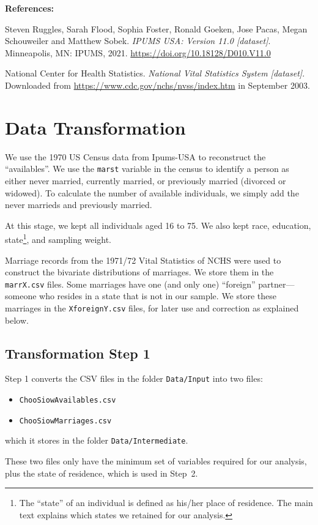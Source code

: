\documentclass[11pt]{article}
\theoremstyle{plain}
\theoremstyle{definition}
\begin{document}
\bigskip

{\bf References:}

Steven Ruggles, Sarah Flood, Sophia Foster, Ronald Goeken, Jose Pacas,
Megan Schouweiler and Matthew Sobek. {\em IPUMS USA: Version 11.0
  [dataset]}. Minneapolis, MN: IPUMS,
2021. \url{https://doi.org/10.18128/D010.V11.0}

National Center for Health Statistics. {\em National Vital Statistics
  System [dataset]}.  Downloaded from
\url{https://www.cdc.gov/nchs/nvss/index.htm} in September 2003.



\section{Data Transformation}
We use the 1970 US Census data from Ipums-USA to reconstruct the ``availables''. 
We use the \verb|marst| variable in the census to identify a person as either never married, currently married, or previously married (divorced or widowed). To calculate the number of available individuals, we simply add the never marrieds and previously married. 

At this stage, we  
kept all individuals aged 16 to 75. We also kept race, education, state\footnote{The ``state'' of an individual is defined as his/her place of residence. The main text explains which states we retained for our analysis.}, and sampling weight.

 
Marriage records from the 1971/72  Vital Statistics of NCHS were used to construct the bivariate distributions of marriages. We store them in the \verb|marrX.csv| files. Some marriages  have one (and only one) ``foreign'' partner---someone who resides in a state that is not in our sample. We store these marriages in the \verb|XforeignY.csv| files, for later use and correction as explained below.


\subsection{Transformation Step 1}
Step 1 converts the CSV files in the folder \verb|Data/Input| into two files:
\begin{itemize}
    \item \verb|ChooSiowAvailables.csv|
    \item \verb|ChooSiowMarriages.csv|
\end{itemize} 
which it stores in the folder \verb|Data/Intermediate|.

These two files only have the minimum set of variables required for our analysis, plus the state of residence, which is used in Step~2. 
\end{document}
